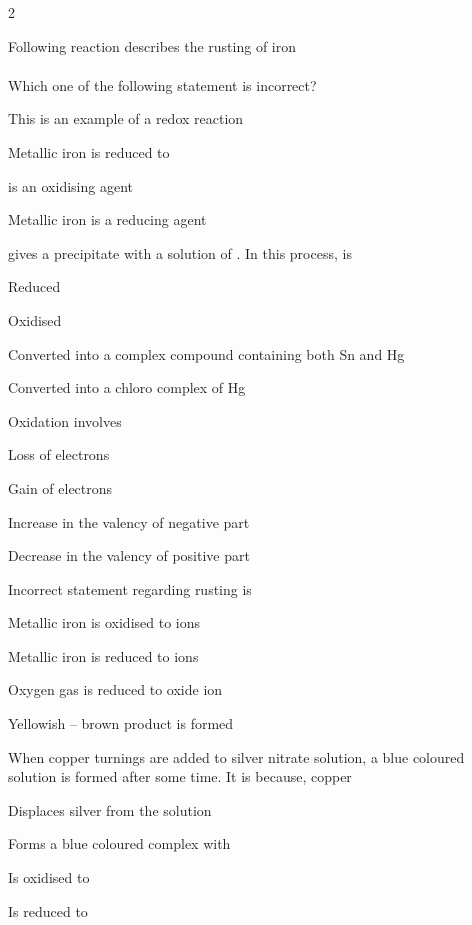 \documentclass[10pt,a4paper]{article}
\begin{document}
\begin{multicols}{2}
\begin{questions}[start=1]
\item Following reaction describes the rusting of iron\\
\\
Which one of the following statement is incorrect?
\begin{options}
  \item This is an example of a redox reaction
  \item Metallic iron is reduced to 
  \item {} is an oxidising agent
  \item Metallic iron is a reducing agent
\end{options}

\item {} gives a precipitate with a solution of . In this process,  is
\begin{options}
  \item Reduced
  \item Oxidised
  \item Converted into a complex compound containing both Sn and Hg
  \item Converted into a chloro complex of Hg
\end{options}

\item Oxidation involves
\begin{options}
  \item Loss of electrons
  \item Gain of electrons
  \item Increase in the valency of negative part
  \item Decrease in the valency of positive part
\end{options}

\item Incorrect statement regarding rusting is
\begin{options}
  \item Metallic iron is oxidised to  ions
  \item Metallic iron is reduced to  ions
  \item Oxygen gas is reduced to oxide ion
  \item Yellowish -- brown product is formed
\end{options}

\item When copper turnings are added to silver nitrate solution, a blue coloured solution is formed after some time. It is because, copper
\begin{options}
  \item Displaces silver from the solution
  \item Forms a blue coloured complex with 
  \item Is oxidised to 
  \item Is reduced to 
\end{options}


\end{questions}
\end{multicols}
\end{document}
